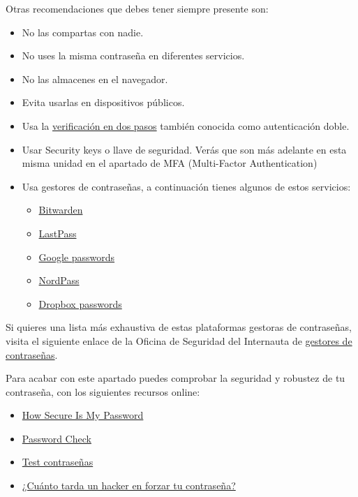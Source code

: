 \documentclass[
  spanish,
  a4paper,
  openany]{book}
\providecommand{\tightlist}{%
  \setlength{\itemsep}{0pt}\setlength{\parskip}{0pt}}
\begin{document}
Otras recomendaciones que debes tener siempre presente son:

\begin{itemize}
\item
  No las compartas con nadie.
\item
  No uses la misma contraseña en diferentes servicios.
\item
  No las almacenes en el navegador.
\item
  Evita usarlas en dispositivos públicos.
\item
  Usa la \href{https://www.osi.es/es/actualidad/blog/2019/02/27/el-factor-de-autenticacion-doble-y-multiple}{verificación en dos pasos} también conocida como autenticación doble.
\item
  Usar Security keys o llave de seguridad. Verás que son más adelante en esta misma unidad en el apartado de MFA (Multi-Factor Authentication)
\item
  Usa gestores de contraseñas, a continuación tienes algunos de estos servicios:

  \begin{itemize}
  \tightlist
  \item
    \href{https://bitwarden.com/}{Bitwarden}
  \item
    \href{https://www.lastpass.com/es/}{LastPass}
  \item
    \href{https://passwords.google.com/}{Google passwords}
  \item
    \href{https://nordpass.com/homepage/}{NordPass}
  \item
    \href{https://www.dropbox.com/es_ES/features/security/passwords}{Dropbox passwords}
  \end{itemize}
\end{itemize}

Si quieres una lista más exhaustiva de estas plataformas gestoras de contraseñas, visita el siguiente enlace de la Oficina de Seguridad del Internauta de \href{https://www.osi.es/es/herramientas-gratuitas/categoria/privacidad-y-seguridad-de-datos/cifrado-de-datos-y-gestion-de-contrasenas}{gestores de contraseñas}.

Para acabar con este apartado puedes comprobar la seguridad y robustez de tu contraseña, con los siguientes recursos online:

\begin{itemize}
\item
  \href{https://howsecureismypassword.net/}{How Secure Is My Password}
\item
  \href{https://password.kaspersky.com/}{Password Check}
\item
  \href{https://www.ontek.net/test-contrasenas/}{Test contraseñas}
\item
  \href{https://www.hivesystems.io/blog/are-your-passwords-in-the-green}{¿Cuánto tarda un hacker en forzar tu contraseña?}
\end{itemize}
\end{document}

